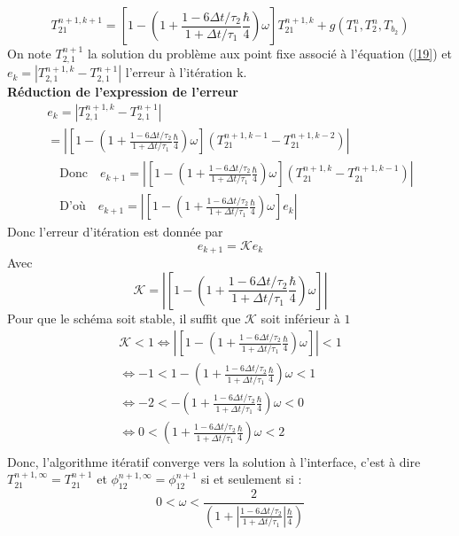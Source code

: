 \documentclass[11pt,a4paper]{scrartcl}%
\newcommand{\va}[1]{\left\lvert#1\right\rvert}%
\newcommand{\mtext}[1]{\quad\text{#1}\quad}%
\begin{document}
\begin{itemize}
\begin{equation}
		T_{21}^{n+1,k+1} = \left[1- \left(1+\frac{1-6\Delta t/\tau_2}{1+\Delta t/\tau_1}\frac{\hbar}{4}\right)\omega \right]T_{21}^{n+1,k} + g(T_1^n, T_2^n, T_{b_2}) 
		\end{equation}
		On note $T_{2,1}^{n+1}$ la solution du problème aux point fixe associé à l'équation (\ref{19}) et $e_k = \va{T_{2,1}^{n+1,k} - T_{2,1}^{n+1}}$ l'erreur à l'itération k. \\
		\textbf{Réduction de l'expression de l'erreur}\\
		\begin{gather*}
		e_k = \va{T_{2,1}^{n+1,k} - T_{2,1}^{n+1}}\\
		= \va{\left[1 - \left(1+\frac{1-6\Delta t/\tau_2}{1+\Delta t/\tau_1}\frac{\hbar}{4}\right)\omega \right]\left(T_{21}^{n+1,k-1} - T_{21}^{n+1,k-2}\right)}\\
		\mtext{Donc} e_{k+1} = \va{\left[1 - \left(1+\frac{1-6\Delta t/\tau_2}{1+\Delta t/\tau_1}\frac{\hbar}{4}\right)\omega \right]\left(T_{21}^{n+1,k} - T_{21}^{n+1,k-1}\right)}\\
		\mtext{D'où}
		e_{k+1} = \va{\left[1 - \left(1+\frac{1-6\Delta t/\tau_2}{1+\Delta t/\tau_1}\frac{\hbar}{4}\right)\omega \right]e_k}    
		\end{gather*}
		Donc l'erreur d'itération est donnée par 
		\begin{equation}
		e_{k+1} = \mathcal{K}e_k
		\end{equation}
		Avec 
		\begin{equation}
		\mathcal{K} = \va{\left[1-\left(1+\frac{1-6\Delta t /\tau_2}{1+\Delta t /\tau_1} \frac{\hbar}{4}\right)\omega \right]}
		\end{equation}
		Pour que le schéma soit stable, il suffit que $\mathcal{K}$ soit inférieur à $1$
		\begin{gather*}
		\mathcal{K} < 1 \iff \va{\left[1-\left(1+\frac{1-6\Delta t /\tau_2}{1+\Delta t /\tau_1} \frac{\hbar}{4}\right)\omega \right]} < 1\\
		\iff -1 < 1-\left(1+\frac{1-6\Delta t /\tau_2}{1+\Delta t /\tau_1} \frac{\hbar}{4}\right)\omega < 1 \\
		\iff -2 < -\left(1+\frac{1-6\Delta t /\tau_2}{1+\Delta t /\tau_1} \frac{\hbar}{4}\right)\omega < 0\\
		\iff 0 < \left(1+\frac{1-6\Delta t /\tau_2}{1+\Delta t /\tau_1} \frac{\hbar}{4}\right)\omega < 2\\
		\end{gather*} 
		Donc, l'algorithme itératif converge vers la solution à l'interface, c'est à dire $T_{21}^{n+1,\infty} = T_{21}^{n+1}$ et $\phi_{12}^{n+1,\infty} = \phi_{12}^{n+1}$ si et seulement si :
		\begin{equation}\label{eq47}
		0 < \omega < \frac{2}{\left(1+\va{\frac{1-6\Delta t /\tau_2}{1+\Delta t /\tau_1}} \frac{\hbar}{4}\right)}
		\end{equation}
		

\end{itemize}
\end{document}
